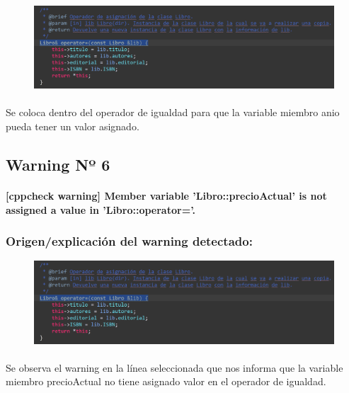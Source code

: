 			\begin{figure}[H]
				\centering
				\includegraphics[scale=0.55]{img/esteban3.png}
				\label{esteban3}
			\end{figure}
		
			\paragraph{}Se coloca dentro del operador de igualdad para que la variable miembro anio pueda tener un valor asignado.
			
	\subsection{Warning Nº 6}
	
		\paragraph{[cppcheck warning] Member variable 'Libro::precioActual' is not assigned a value in 'Libro::operator='.}
	
		\subsubsection{Origen/explicación del warning detectado:}
		
			\begin{figure}[H]
				\centering
				\includegraphics[scale=0.55]{img/esteban4.png}
				\label{esteban4}
			\end{figure}
		
			\paragraph{}Se observa el warning en la línea seleccionada que nos informa que la variable miembro precioActual no tiene asignado valor en el operador de igualdad.
			
